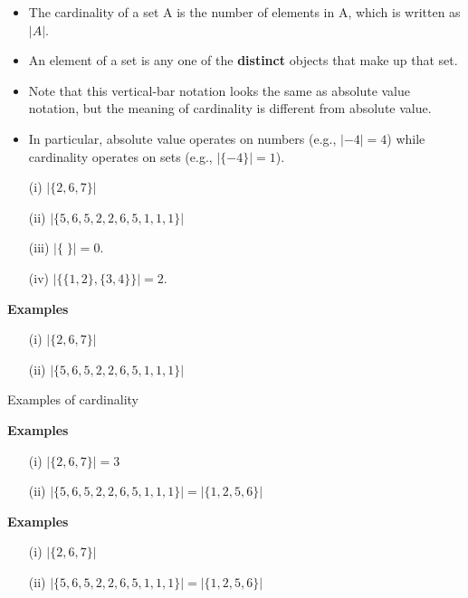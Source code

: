\begin{itemize}
\item The cardinality of a set A is the number of elements in A, which is written as $|A|$.
\item An element of a set is any one of the \textbf{distinct} objects that make up that set.



\item Note that this vertical-bar notation looks the same as absolute value notation, 
but the meaning of cardinality is different from absolute value.

\item In particular, absolute value operates on numbers (e.g., $|-4| = 4$) 
while cardinality operates on sets (e.g., $|\{-4\}| = 1$).

\item[(i)] $|\{2,6,7\}|$
\item[(ii)] $|\{5,6,5,2,2,6,5,1,1,1\}|$
\item[(iii)] $|\{ \;\}| = 0$. %
\item[(iv)] $|\{\{1,2\},\{3,4\}\}| = 2$. 
\end{itemize}


\textbf{Examples}
\begin{itemize}
\item[(i)] $|\{2,6,7\}| $
\vspace{2cm}
\item[(ii)] $|\{5,6,5,2,2,6,5,1,1,1\}| $
\end{itemize}



{Examples of cardinality}

\textbf{Examples}
\begin{itemize}
\item[(i)] $|\{2,6,7\}| = 3 $
\vspace{2cm}
\item[(ii)] $|\{5,6,5,2,2,6,5,1,1,1\}| = |\{1,2,5,6\}| $
\end{itemize}


\textbf{Examples}
\begin{itemize}
\item[(i)] $|\{2,6,7\}| $
\vspace{2cm}
\item[(ii)] $|\{5,6,5,2,2,6,5,1,1,1\}| = |\{1,2,5,6\}| $
\end{itemize}


